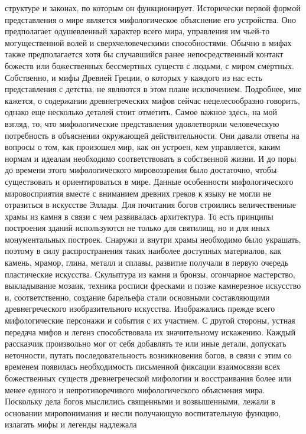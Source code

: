 структуре и законах, по которым он функционирует. Исторически первой формой
представления о мире является мифологическое объяснение его устройства. Оно
предполагает одушевленный характер всего мира, управления им чьей-то
могущественной волей и сверхчеловеческими способностями. Обычно в мифах также
предполагается хотя бы случавшийся ранее непосредственный контакт божеств или
божественных бессмертных существ с людьми, с миром смертных. Собственно, и мифы
Древней Греции, о которых у каждого из нас есть представления с детства, не
являются в этом плане исключением. Подробнее, мне кажется, о содержании
древнегреческих мифов сейчас нецелесообразно говорить, однако еще несколько
деталей стоит отметить. Самое важное здесь, на мой взгляд, то, что
мифологические представления удовлетворяли человеческую потребность в объяснении
окружающей действительности. Они давали ответы на вопросы о том, как произошел
мир, как он устроен, кем управляется, каким нормам и идеалам необходимо
соответствовать в собственной жизни. И до поры до времени этого мифологического
мировоззрения было достаточно, чтобы существовать и ориентироваться в мире.
Данные особенности мифологического мировосприятия вместе с вниманием древних
греков к языку не могли не отразиться в искусстве Эллады. Для почитания богов
строились величественные храмы из камня в связи с чем развивалась архитектура.
То есть принципы построения зданий используются не только для святилищ, но и для
иных монументальных построек. Снаружи и внутри храмы необходимо было украшать,
поэтому в силу распространения таких наиболее доступных материалов, как камень,
мрамор, глина, металл и сплавы, развитие получали в первую очередь пластические
искусства. Скульптура из камня и бронзы, огончарное мастерство, выкладывание
мозаик, техника росписи фресками и позже камнерезное искусство и,
соответственно, создание барельефа стали основными составляющими
древнегреческого изобразительного искусства. Изображались прежде всего
мифологические персонажи и события с их участием. С другой стороны, устная
передача мифов и легенз способствовала их значительному искажению. Каждый
рассказчик произвольно мог от себя добавлять те или иные детали, допускать
неточности, путать последовательность возникновения богов, в связи с этим со
временем появилась необходимость письменной фиксации взаимосвязи всех
божественных существ древнегреческой мифологии и восстраивания более или менее
единого и непротиворечивого мифологического объяснения мира. Поскольку дела
богов мыслились священными и возвышенными, лежали в основании миропонимания и
несли получающую воспитательную функцию, излагать мифы и легенды надлежала
